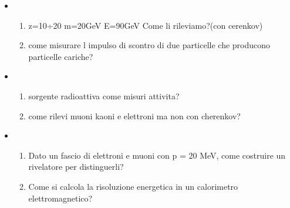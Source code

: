 \documentclass[../main.tex]{subfiles}
\begin{document}
\begin{itemize}
\begin{enumerate}
\end{enumerate}
\item \begin{enumerate}
    \item z=10÷20 m=20GeV E=90GeV Come li rileviamo?(con cerenkov)\\
   \item come misurare l impulso di scontro di due particelle che producono particelle cariche?
\end{enumerate}
\item \begin{enumerate}
    \item sorgente radioattiva come misuri attivita?\\
   \item come rilevi muoni kaoni e elettroni ma non con cherenkov?
\end{enumerate}
\item \begin{enumerate}
    \item Dato un fascio di elettroni e muoni con p = 20 MeV, come costruire un rivelatore per distinguerli? 
    \item Come si calcola la risoluzione energetica in un calorimetro elettromagnetico?
\end{enumerate}

\end{itemize}
\end{document}
